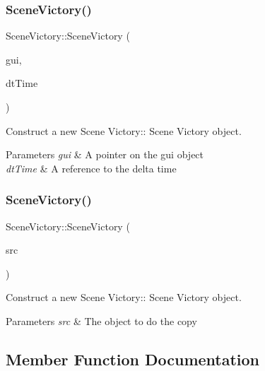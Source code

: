 \subsubsection{\texorpdfstring{Scene\+Victory()}{SceneVictory()}\hspace{0.1cm}{\footnotesize\ttfamily [1/2]}}
{\footnotesize\ttfamily Scene\+Victory\+::\+Scene\+Victory (\begin{DoxyParamCaption}\item[{\hyperlink{class_gui}{Gui} $\ast$}]{gui,  }\item[{float const \&}]{dt\+Time }\end{DoxyParamCaption})}



Construct a new Scene Victory\+:\+: Scene Victory object. 


\begin{DoxyParams}{Parameters}
{\em gui} & A pointer on the gui object \\
\hline
{\em dt\+Time} & A reference to the delta time \\
\hline
\end{DoxyParams}
\mbox{\label{class_scene_victory_ad7ae2aaaf4a2a107713ab351aeac9662}} 
\subsubsection{\texorpdfstring{Scene\+Victory()}{SceneVictory()}\hspace{0.1cm}{\footnotesize\ttfamily [2/2]}}
{\footnotesize\ttfamily Scene\+Victory\+::\+Scene\+Victory (\begin{DoxyParamCaption}\item[{\hyperlink{class_scene_victory}{Scene\+Victory} const \&}]{src }\end{DoxyParamCaption})}



Construct a new Scene Victory\+:\+: Scene Victory object. 


\begin{DoxyParams}{Parameters}
{\em src} & The object to do the copy \\
\hline
\end{DoxyParams}


\subsection{Member Function Documentation}
\mbox{\label{class_scene_victory_ac79e3eadfb4bfafa8733888a1e86f57e}} 
